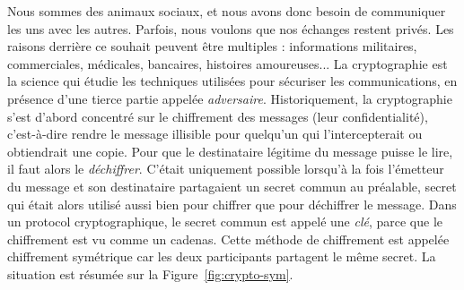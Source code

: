 Nous sommes des animaux sociaux, et nous avons donc besoin de communiquer les
uns avec les autres. Parfois, nous voulons que nos échanges restent privés.
Les raisons derrière ce souhait peuvent être multiples : informations
militaires, commerciales, médicales, bancaires, histoires amoureuses... La
cryptographie est la science qui étudie les techniques utilisées pour sécuriser
les communications, en présence d'une tierce partie appelée \emph{adversaire}.
Historiquement, la cryptographie s'est d'abord concentré sur le chiffrement des
messages (leur confidentialité), c'est-à-dire rendre le message illisible pour
quelqu'un qui l'intercepterait ou obtiendrait une copie. Pour que le
destinataire légitime du message puisse le lire, il faut alors le
\emph{déchiffrer}. C'était uniquement possible lorsqu'à la fois l'émetteur du
message et son destinataire partagaient un secret commun au préalable, secret
qui était alors utilisé aussi bien pour chiffrer que pour déchiffrer le message.
Dans un protocol cryptographique, le secret commun est appelé une
\emph{clé}, parce que le chiffrement est vu comme un cadenas. Cette méthode de
chiffrement est appelée chiffrement symétrique car les deux participants
partagent le même secret. La situation est résumée sur la
Figure~\ref{fig:crypto-sym}.
